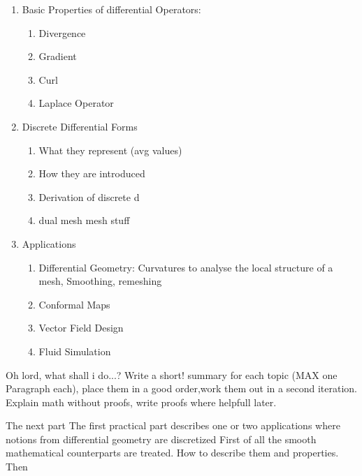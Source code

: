 \begin{enumerate}
\item Basic Properties of differential Operators:
	\begin{enumerate}
		\item Divergence
		\item Gradient
		\item Curl
		\item Laplace Operator
	\end{enumerate}
\item Discrete Differential Forms
	\begin{enumerate}
		\item What they represent (avg values)
		\item How they are introduced
		\item Derivation of discrete d 
		\item dual mesh mesh stuff
	\end{enumerate}
\item Applications
	\begin{enumerate}
		\item Differential Geometry: Curvatures to analyse the local structure of a mesh, Smoothing, remeshing
		\item Conformal Maps
		\item Vector Field Design
		\item Fluid Simulation
	\end{enumerate}
\end{enumerate}
Oh lord, what shall i do...? Write a short! summary for each topic (MAX one Paragraph each), place them in a good order,work them out in a second iteration. Explain math without proofs, write proofs where helpfull later.

The next part 
The first practical part describes one or two applications where notions from differential geometry are discretized
First of all the smooth mathematical counterparts are treated. How to describe them and properties. Then 

